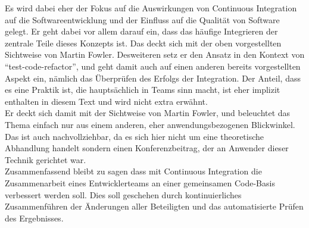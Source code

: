 Es wird dabei eher der Fokus auf die Auswirkungen von Continuous Integration auf die Softwareentwicklung und der Einfluss auf die Qualität von Software gelegt. Er geht dabei vor allem darauf ein, dass das häufige Integrieren der zentrale Teile dieses Konzepts ist. Das deckt sich mit der oben vorgestellten Sichtweise von Martin Fowler. Desweiteren setz er den Ansatz in den Kontext von "`test-code-refactor"', und geht damit auch auf einen anderen bereits vorgestellten Aspekt ein, nämlich das Überprüfen des Erfolgs der Integration. Der Anteil, dass es eine Praktik ist, die hauptsächlich in Teams sinn macht, ist eher implizit enthalten in diesem Text und wird nicht extra erwähnt.\\
Er deckt sich damit mit der Sichtweise von Martin Fowler, und beleuchtet das Thema einfach nur aus einem anderen, eher anwendungsbezogenen Blickwinkel. Das ist auch nachvollziehbar, da es sich hier nicht um eine theoretische Abhandlung handelt sondern einen Konferenzbeitrag, der an Anwender dieser Technik gerichtet war.\\

Zusammenfassend bleibt zu sagen dass mit Continuous Integration die Zusammenarbeit eines Entwicklerteams an einer gemeinsamen Code-Basis verbessert werden soll. Dies soll geschehen durch kontinuierliches Zusammenführen der Änderungen aller Beteiligten und das automatisierte Prüfen des Ergebnisses.
